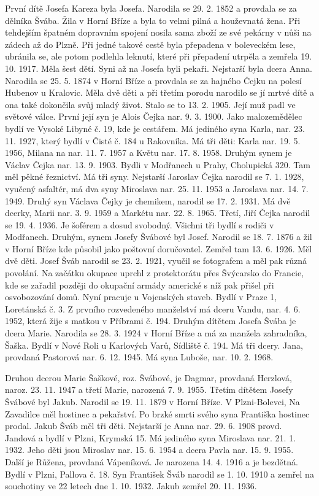 \documentclass[../dejiny-rodu-prusiku.tex]{subfiles}
\begin{document}
První dítě Josefa Kareza byla Josefa. Narodila se 29. 2. 1852 a provdala se za dělníka Švába. Žila v Horní Bříze a byla to velmi pilná a houževnatá žena. Při tehdejším špatném dopravním spojení nosila sama zboží ze své pe­kárny v nůši na zádech až do Plzně. Při jedné takové cestě byla přepadena v boleveckém lese, ubránila se, ale potom podlehla leknutí, které při přepadení utrpěla a zemřela 19. 10. 1917. Měla šest dětí. Syni až na Josefa byli pekaři. Nejstarší byla dcera Anna. Narodila se 25. 5. 1874 v Hor­ní Bříze a provdala se za hajného Čejku na polesí Hubenov u Kralovic. Měla dvě děti a při třetím porodu naro­dilo se jí mrtvé dítě a ona také dokončila svůj mladý život. Stalo se to 13. 2. 1905. Její muž padl ve světové válce. První její syn je Alois Čejka nar. 9. 3. 1900. Jako malozemědělec bydlí ve Vysoké Libyné č. 19, kde je cestářem. Má jediného syna Karla, nar. 23. 11. 1927, který bydlí v Čisté č. 184 u Rakovníka. Má tři děti: Karla nar. 19. 5. 1956, Milana na nar. 11. 7. 1957 a Květu nar. 17. 8. 1958. Druhým synem je Václav Čejka nar. 13. 9. 1903. Bydli v Modřanech u Prahy, Cholupická 320. Tam měl pěkné řeznictví. Má tři sy­ny. Nejstarší Jaroslav Čejka narodil se 7. 1. 1928, vyučený asfaltér, má dva syny Miroslava nar. 25. 11. 1953 a Ja­roslava nar. 14. 7. 1949. Druhý syn Václava Čejky je chemikem, narodil se 17. 2. 1931. Má dvě dcerky, Marii nar. 3. 9. 1959 a Markétu nar. 22. 8. 1965. Třetí, Jiří Čejka narodil se 19. 4. 1936. Je šoférem a dosud svobodný. Všichni tři bydlí s rodiči v Modřanech. Druhým, synem Josefy Švábové byl Josef. Narodil se 18. 7. 1876 a žil v Horní Bříze kde působil jako poštovní doručovatel. Zemřel tam 13. 6. 1926. Měl dvě děti. Josef Šváb narodil se 23. 2.  1921, vyučil se fotografem a měl pak různá povolání. Na začátku okupace uprchl z protektorátu přes Švýcarsko do Francie, kde se zařadil později do okupační armády americké s níž pak přišel při osvobozování domů. Nyní pracuje u Vojenských staveb. Bydlí v Praze 1, Loretánská č. 3. Z prvního rozvedeného manželství má dceru Vandu, nar. 4. 6. 1952, která žije s matkou v Příbrami č. 194. Druhým dítětem Josefa Švába je dcera Marie. Narodila se 28. 3. 1924 v Horní Bříze a má za manžela zahradníka, Šaška. Bydlí v Nové Roli u Karlových Varů, Sídliště č. 194. Má tři dcery. Jana, provdaná Pastorová nar. 6. 12. 1945. Má syna Luboše, nar. 10. 2. 1968.


Druhou dcerou Marie Šaškové, roz. Švábové, je Dagmar, provdaná Herzlová, naroz. 23. 11. 1947 a třetí Marie, narozená 7. 9. 1955. Třetím dítětem Josefy Švábové byl Jakub. Narodil se 19. 11. 1879 v Horní Bříze. V Plzni-Bolevci, Na Zavadilce měl hostinec a pekařství. Po brzké smrti své­ho syna Františka hostinec prodal. Jakub Šváb měl tři děti. Nejstarší je Anna nar. 29. 6. 1908 provd. Jandová a bydlí v Plzni, Krymská 15. Má jediného syna Mirosla­va nar. 21. 1. 1932. Jeho děti jsou Miroslav nar. 15. 6. 1954 a dcera Pavla nar. 15. 9. 1955. Další je Růžena, provdaná Vápeníková. Je narozena 14. 4. 1916 a je bezdětná. Bydlí v Plzni, Pallova č. 18. Syn František Šváb narodil se 1. 10. 1910 a zemřel na souchotiny ve 22 letech dne 1. 10. 1932. Jakub zemřel 20. 11. 1936.
\end{document}
